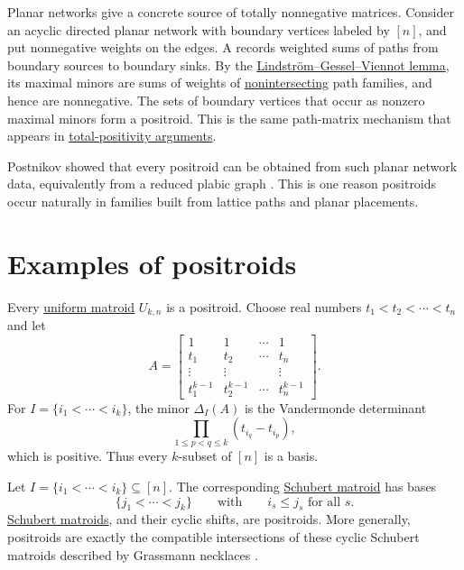 Planar networks give a concrete source of totally nonnegative matrices.
Consider an acyclic directed planar network with boundary vertices labeled by
$[n]$, and put nonnegative weights on the edges.  A
\label{boundaryMeasurementMatrix} records
weighted sums of paths from boundary sources to boundary sinks.  By the
\hyperref[lgvLemma]{Lindstr\"om--Gessel--Viennot lemma}, its maximal minors are
sums of weights of \hyperref[nonintersectingPaths]{nonintersecting} path
families, and hence are nonnegative.
The sets of boundary vertices that occur as nonzero maximal minors form a
positroid.  This is the same path-matrix mechanism that appears in
\hyperref[tnnPathMatrix]{total-positivity arguments}.

Postnikov showed that every positroid can be obtained from such planar
network data, equivalently from a reduced plabic graph
\cite{Postnikov2006x}.  This is one reason positroids occur naturally in
families built from lattice paths and planar placements.


\section[positroidExamples]{Examples of positroids}

\begin{example}
Every \hyperref[matroidUniform]{uniform matroid} $U_{k,n}$ is a positroid.
Choose real numbers
$t_1\lt t_2\lt \dotsb \lt t_n$ and let
\[
  A =
  \begin{bmatrix}
    1 & 1 & \dotsb & 1 \\
    t_1 & t_2 & \dotsb & t_n \\
    \vdots & \vdots & & \vdots \\
    t_1^{k-1} & t_2^{k-1} & \dotsb & t_n^{k-1}
  \end{bmatrix}.
\]
For $I=\{i_1\lt \dotsb \lt i_k\}$, the minor $\Delta_I(A)$ is the Vandermonde
determinant
\[
  \prod_{1\leq p\lt q\leq k} (t_{i_q}-t_{i_p}),
\]
which is positive.  Thus every $k$-subset of $[n]$ is a basis.
\end{example}

\begin{example}
Let $I=\{i_1\lt \dotsb \lt i_k\}\subseteq [n]$.  The corresponding
\hyperref[schubertMatroidDefinition]{Schubert matroid} has bases
\[
  \{j_1\lt \dotsb \lt j_k\}
  \qquad \text{with} \qquad
  i_s\leq j_s \text{ for all } s.
\]
\hyperref[schubertMatroidDefinition]{Schubert matroids}, and their cyclic
shifts, are positroids.  More generally,
positroids are exactly the compatible intersections of these cyclic Schubert
matroids described by Grassmann necklaces \cite{Oh2011}.
\end{example}


